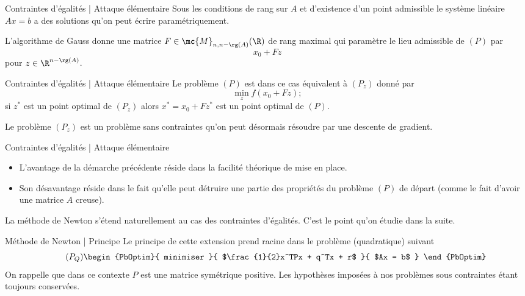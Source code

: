 \documentclass[aspectratio = 169]{beamer}
\begin{document}
\begin{frame}{Contraintes d'égalités | Attaque élémentaire}
  Sous les conditions de rang sur $A$ et d'existence d'un point
  admissible le système linéaire $Ax = b$ a des solutions qu'on peut
  écrire paramétriquement.
  \pause

  L'algorithme de Gauss donne une matrice
  $F \in \mc{M}_{n, n - \rg(A)}(\R)$ de rang maximal qui paramètre le lieu
  admissible de $(P)$ par
  \[
    x_0 + Fz
  \]
  pour $z \in \R^{n - \rg(A)}$.
\end{frame}

\begin{frame}{Contraintes d'égalités | Attaque élémentaire}
  Le problème $(P)$ est dans ce cas équivalent à $(P_z)$ donné par
  \begin{equation}
    \label{Pz}
    \tag{$P_z$}
      \min_{z} f(x_0 + Fz) ;
  \end{equation}
  si $z^*$ est un point optimal de $(P_z)$ alors $x^* = x_0 + Fz^*$
  est un point optimal de $(P)$. \pause

  Le problème $(P_z)$ est un problème sans contraintes qu'on peut
  désormais résoudre par une descente de gradient.
\end{frame}

\begin{frame}{Contraintes d'égalités | Attaque élémentaire}
  \begin{itemize}
  \item<1-> L'avantage de la démarche précédente réside dans la
    facilité théorique de mise en place.
  \item<2-> Son désavantage réside dans le fait qu'elle peut détruire
    une partie des propriétés du problème $(P)$ de départ (comme le
    fait d'avoir une matrice $A$ creuse).
  \end{itemize}
  \pause[3]

  La méthode de Newton s'étend naturellement au cas des contraintes
  d'égalités. C'est le point qu'on étudie dans la suite.
\end{frame}

\begin{frame}{Méthode de Newton | Principe}
  Le principe de cette extension prend racine dans le problème
  (quadratique) suivant
  \begin{equation}
    \label{PQ}
    \tag{$P_Q$}
    \begin{PbOptim}{
        minimiser
      }{
        $\frac{1}{2}x^TPx + q^Tx + r$
      }{
        $Ax = b$
      }
    \end{PbOptim}
  \end{equation}
  On rappelle que dans ce contexte $P$ est une matrice symétrique
  positive. Les hypothèses imposées à nos problèmes sous contraintes
  étant toujours conservées.
\end{frame}
\end{document}
